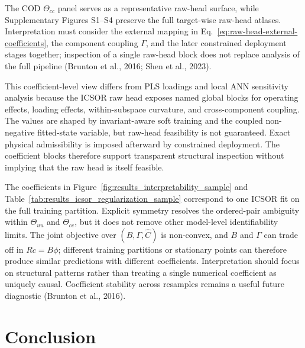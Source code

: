 \documentclass[a4paper,fleqn]{cas-sc}
\DeclareRobustCommand{\currentrev}[1]{{\color{currentRevisionBlue}#1}}
\newenvironment{currentrevblock}{\begingroup\color{currentRevisionBlue}}{\endgroup}
\DeclareRobustCommand{\currentrev}[1]{#1}
\newenvironment{currentrevblock}{}{}
\newcommand{\rev}[1]{#1}
\newcommand{\revitem}[2]{#2}
\newenvironment{revblock}{}{}
\newenvironment{revblockr21}{}{}
\begin{document}
\begin{revblock}
\begin{revblockr21}
\begin{currentrevblock}
The COD $\Theta_{cc}$ panel serves as a representative raw-head surface, while Supplementary Figures S1--S4 preserve the full target-wise raw-head atlases. Interpretation must consider the external mapping in Eq.~\eqref{eq:raw-head-external-coefficients}, the component coupling $\Gamma$, and the later constrained deployment stages together; inspection of a single raw-head block does not replace analysis of the full pipeline (Brunton et al., 2016; Shen et al., 2023).
\end{currentrevblock}

\revitem{revRtwoOne}{\currentrev{This coefficient-level view differs from PLS loadings and local ANN sensitivity analysis because the ICSOR raw head exposes named global blocks for operating effects, loading effects, within-subspace curvature, and cross-component coupling. The values are shaped by invariant-aware soft training and the coupled non-negative fitted-state variable, but raw-head feasibility is not guaranteed. Exact physical admissibility is imposed afterward by constrained deployment. The coefficient blocks therefore support transparent structural inspection without implying that the raw head is itself feasible.}}

\revitem{revRtwoFour}{\currentrev{The coefficients in Figure~\ref{fig:results_interpretability_sample} and Table~\ref{tab:results_icsor_regularization_sample} correspond to one ICSOR fit on the full training partition. Explicit symmetry resolves the ordered-pair ambiguity within $\Theta_{uu}$ and $\Theta_{cc}$, but it does not remove other model-level identifiability limits. The joint objective over $(B,\Gamma,\widehat{C})$ is non-convex, and $B$ and $\Gamma$ can trade off in $Rc=B\phi$; different training partitions or stationary points can therefore produce similar predictions with different coefficients. Interpretation should focus on structural patterns rather than treating a single numerical coefficient as uniquely causal. Coefficient stability across resamples remains a useful future diagnostic (Brunton et al., 2016).}}
\end{revblockr21}

\end{revblock}

\section{\rev{Conclusion}}
\end{document}
